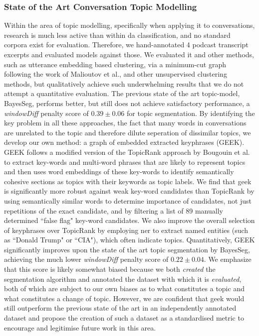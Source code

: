 \subsubsection{State of the Art Conversation Topic Modelling}
    Within the area of topic modelling, specifically when applying it to conversations, research is much less active than within \gls{da} classification, and no standard corpora exist for evaluation. Therefore, we hand-annotated 4 podcast transcript excerpts and evaluated \glspl{model} against those. We evaluated it and other methods, such as \gls{utterance} \gls{embedding} based clustering, via a minimum-cut graph following the work of Malioutov et al., and other unsupervised clustering methods, but qualitatively achieve such underwhelming results that we do not attempt a quantitative evaluation. The previous state of the art topic-\gls{model}, BayesSeg, performs better, but still does not achieve satisfactory performance, a \textit{windowDiff} penalty score of $0.39 \pm 0.06$ for topic segmentation.
    By identifying the key problem in all these approaches, the fact that many words in conversations are unrelated to the topic and therefore dilute seperation of dissimilar topics, we develop our own method: a graph of embedded extracted \glspl{keyphrase} (GEEK).
    GEEK follows a modified version of the TopicRank approach by Bougouin et al. to extract key-words and multi-word phrases that are likely to represent topics and then uses word \glspl{embedding} of these key-words to identify semantically cohesive sections as topics with their keywords as topic labels. We find that \gls{geek} is significantly more robust against weak key-word candidates than TopicRank by using semantically similar words to determine importance of candidates, not just repetitions of the exact candidate, and by filtering a list of 89 manually determined ``false flag" key-word candidates. We also improve the overall selection of \glspl{keyphrase} over TopicRank by employing \gls{ner} to extract named entities (such as ``Donald Trump" or ``CIA"), which often indicate topics. Quantitatively, GEEK significantly improves upon the state of the art topic segmentation by BayesSeg, achieving the much lower \textit{windowDiff} penalty score of $\mathbf{0.22 \pm 0.04}$. We emphasize that this score is likely somewhat biased because we both \textit{created} the segmentation algorithm and annotated the dataset with which it is \textit{evaluated}, both of which are subject to our own biases as to what constitutes a topic and what constitutes a change of topic. However, we are confident that \gls{geek} would still outperform the previous state of the art in an independently annotated dataset and propose the creation of such a dataset as a standardised metric to encourage and legitimise future work in this area.

